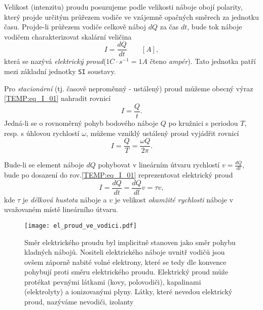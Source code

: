      Velikost (intenzitu) proudu posuzujeme podle velikosti náboje obojí polarity, který projde
      určitým průřezem vodiče ve vzájemně opačných směrech za jednotku času. Projde-li průřezem
      vodiče celkově náboj $dQ$ za čas $dt$, bude tok náboje vodičem charakterizovat skalární
      veličina
        \begin{equation}\label{TEMP:eq_I_01}
          I = \frac{dQ}{dt} \qquad[A],  
        \end{equation}        
      která se nazývá \emph{elektrický proud}($1C\cdot s^{-1} = 1A $ čteno \emph{ampér}). Tato
      jednotka patří mezi základní jednotky \texttt{SI} soustavy.
      
      Pro \emph{stacionární} (tj. časově neproměnný - ustálený) proud můžeme obecný výraz
      \ref{TEMP:eq_I_01} nahradit rovnicí
        \begin{equation}\label{TEMP:eq_I_02}
          I = \frac{Q}{t}.  
        \end{equation}       
      Jedná-li se o rovnoměrný pohyb bodového náboje $Q$ po kružnici s periodou $T$, resp. s
      úhlovou rychlostí $\omega$, můžeme vzniklý ustálený proud vyjádřit rovnicí 
        \begin{equation}\label{TEMP:eq_I_03}
          I = \frac{Q}{T} = \frac{\omega Q}{2\pi}.  
        \end{equation}
      
      Bude-li se element náboje $dQ$ pohybovat v lineárním útvaru rychlostí $v = \frac{dQ}{dl}$,
      bude po dosazení do rov.\ref{TEMP:eq_I_01} reprezentovat elektrický proud 
        \begin{equation}\label{TEMP:eq_I_04}
          I = \frac{dQ}{dt} = \frac{dQ}{dl}v = \tau v, 
        \end{equation}      
      kde $\tau$ je \emph{délková hustota} náboje a $v$ je velikost \emph{okamžité rychlosti}
      náboje v uvažovaném místě lineárního útvaru. 

      \begin{figure}[ht!]
         \centering
         \texttt{[image: el\_proud\_ve\_vodici.pdf]}
         \caption[Náboje, pohybující se vodičem]{Směr elektrického proudu byl implicitně stanoven
                  jako směr pohybu kladných nábojů. Nositeli elektrického náboje uvnitř vodičů jsou
                  ovšem záporně nabité volné elektrony, které se tedy dle  konvence pohybují proti
                  směru elektrického proudu. Elektrický proud může protékat pevnými látkami (kovy,
                  polovodiči), kapalinami (elektrolyty) a ionizovanými plyny. Látky, které nevedou
                  elektrický proud, nazýváme nevodiči, izolanty}
         \label{TEMP:fig_el_proud_ve_vodici}
      \end{figure}
      
